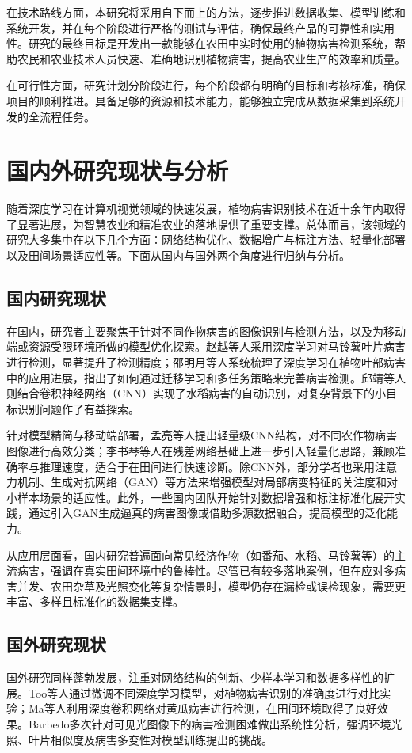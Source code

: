 在技术路线方面，本研究将采用自下而上的方法，逐步推进数据收集、模型训练和系统开发，并在每个阶段进行严格的测试与评估，确保最终产品的可靠性和实用性。研究的最终目标是开发出一款能够在农田中实时使用的植物病害检测系统，帮助农民和农业技术人员快速、准确地识别植物病害，提高农业生产的效率和质量。

在可行性方面，研究计划分阶段进行，每个阶段都有明确的目标和考核标准，确保项目的顺利推进。具备足够的资源和技术能力，能够独立完成从数据采集到系统开发的全流程任务。

\section{国内外研究现状与分析}
随着深度学习在计算机视觉领域的快速发展，植物病害识别技术在近十余年内取得了显著进展，为智慧农业和精准农业的落地提供了重要支撑\cite{2,19,27}。总体而言，该领域的研究大多集中在以下几个方面：网络结构优化、数据增广与标注方法、轻量化部署以及田间场景适应性等。下面从国内与国外两个角度进行归纳与分析。
\subsection{国内研究现状}
在国内，研究者主要聚焦于针对不同作物病害的图像识别与检测方法，以及为移动端或资源受限环境所做的模型优化探索。赵越等人\cite{1}采用深度学习对马铃薯叶片病害进行检测，显著提升了检测精度；邵明月等人\cite{2}系统梳理了深度学习在植物叶部病害中的应用进展，指出了如何通过迁移学习和多任务策略来完善病害检测。邱靖等人\cite{3}则结合卷积神经网络（CNN）实现了水稻病害的自动识别，对复杂背景下的小目标识别问题作了有益探索。

针对模型精简与移动端部署，孟亮等人\cite{4}提出轻量级CNN结构，对不同农作物病害图像进行高效分类；李书琴等人\cite{5}在残差网络基础上进一步引入轻量化思路，兼顾准确率与推理速度，适合于在田间进行快速诊断。除CNN外，部分学者也采用注意力机制、生成对抗网络（GAN）等方法来增强模型对局部病变特征的关注度和对小样本场景的适应性\cite{2}。此外，一些国内团队开始针对数据增强和标注标准化展开实践，通过引入GAN生成逼真的病害图像或借助多源数据融合，提高模型的泛化能力\cite{21}。

从应用层面看，国内研究普遍面向常见经济作物（如番茄、水稻、马铃薯等）的主流病害，强调在真实田间环境中的鲁棒性\cite{3,4}。尽管已有较多落地案例，但在应对多病害并发、农田杂草及光照变化等复杂情景时，模型仍存在漏检或误检现象，需要更丰富、多样且标准化的数据集支撑\cite{22,29}。
\subsection{国外研究现状}
国外研究同样蓬勃发展，注重对网络结构的创新、少样本学习和数据多样性的扩展。Too等人\cite{6}通过微调不同深度学习模型，对植物病害识别的准确度进行对比实验；Ma等人\cite{7}利用深度卷积网络对黄瓜病害进行检测，在田间环境取得了良好效果。Barbedo\cite{8,22,29}多次针对可见光图像下的病害检测困难做出系统性分析，强调环境光照、叶片相似度及病害多变性对模型训练提出的挑战。

